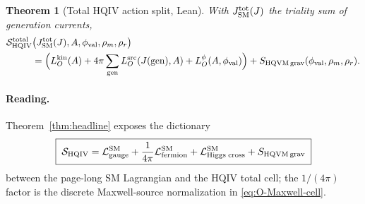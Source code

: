 \documentclass[11pt]{amsart}
\newtheorem{theorem}{Theorem}[section]
\begin{document}
\begin{theorem}[Total HQIV action split, Lean]
With $J_{\rm SM}^{\rm tot}(J)$ the triality sum of generation currents,
\begin{align*}
\mathcal{S}_{\mathrm{HQIV}}^{\mathrm{total}}&\bigl(J_{\rm SM}^{\rm tot}(J),A,\phi_{\rm val},\rho_m,\rho_r\bigr) \\
&= \Bigl(L_O^{\rm kin}(A)
+ 4\pi\sum_{\rm gen} L_O^{\rm src}(J({\rm gen}),A)
+ L_O^\phi(A,\phi_{\rm val})\Bigr) + S_{\rm HQVM\,grav}(\phi_{\rm val},\rho_m,\rho_r).
\end{align*}
\end{theorem}

\paragraph{Reading.}
Theorem~\ref{thm:headline} exposes the dictionary
\[
\boxed{\;
\mathcal{S}_{\rm HQIV}
= \mathcal{L}_{\rm gauge}^{\rm SM}
+ \frac{1}{4\pi}\mathcal{L}_{\rm fermion}^{\rm SM}
+ \mathcal{L}_{\rm Higgs\;cross}^{\rm SM}
+ S_{\rm HQVM\,grav}
\;}
\]
between the page-long SM Lagrangian and the HQIV total cell; the $1/(4\pi)$ factor is the discrete Maxwell-source normalization in \eqref{eq:O-Maxwell-cell}.
\end{document}
